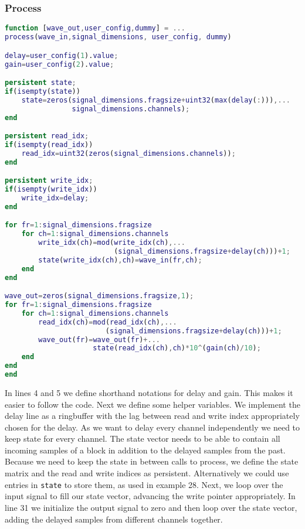 \documentclass[11pt,a4paper,twoside]{article}
\newcommand{\+}{\discretionary{\mbox{\scriptsize$\hookleftarrow$}}{}{}}
\begin{document}
\subsubsection*{Process}
\begin{lstlisting}[language=Matlab]
function [wave_out,user_config,dummy] = ...
process(wave_in,signal_dimensions, user_config, dummy)

delay=user_config(1).value;
gain=user_config(2).value;

persistent state;
if(isempty(state))
    state=zeros(signal_dimensions.fragsize+uint32(max(delay(:))),...
                signal_dimensions.channels);
end

persistent read_idx;
if(isempty(read_idx))
    read_idx=uint32(zeros(signal_dimensions.channels));
end

persistent write_idx;
if(isempty(write_idx))
    write_idx=delay;
end

for fr=1:signal_dimensions.fragsize
    for ch=1:signal_dimensions.channels
        write_idx(ch)=mod(write_idx(ch),...
                          (signal_dimensions.fragsize+delay(ch)))+1;
        state(write_idx(ch),ch)=wave_in(fr,ch);
    end
end

wave_out=zeros(signal_dimensions.fragsize,1);
for fr=1:signal_dimensions.fragsize
    for ch=1:signal_dimensions.channels
        read_idx(ch)=mod(read_idx(ch),... 
                        (signal_dimensions.fragsize+delay(ch)))+1;
        wave_out(fr)=wave_out(fr)+...
                     state(read_idx(ch),ch)*10^(gain(ch)/10);
    end
end
end
\end{lstlisting}
In lines 4 and 5 we define shorthand notations for delay and gain. This makes it
easier to follow the code.
Next we define some helper variables. We implement
the delay line as a ringbuffer with the lag between read and write index
appropriately chosen for the delay. As we want to delay every channel
independently we need to keep state for every channel. The state vector
needs to be able to contain all incoming samples of a block in addition to the
delayed samples from the past. Because we need to keep the state in between
calls to process, we define the state matrix and the read and write indices as
persistent. Alternatively we could use entries in \texttt{state} to
store them, as used in example 28.
Next, we loop over the input signal to fill our state vector,
advancing the write pointer appropriately. In line 31 we initialize the output
signal to zero and then loop over the state vector, adding the delayed samples
from different channels together.
\end{document}
